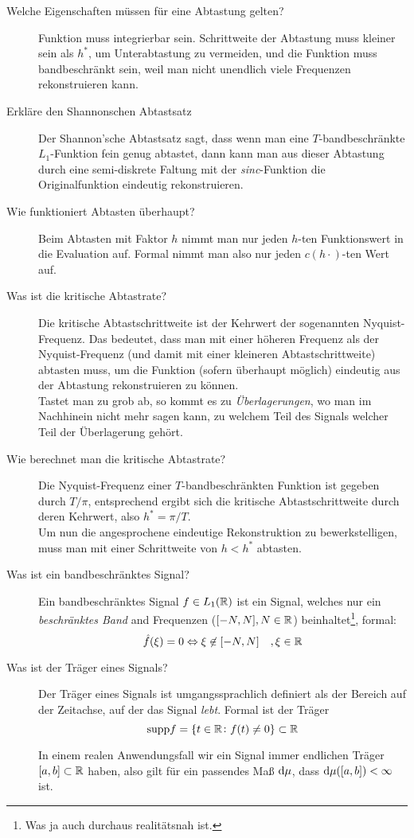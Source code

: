 \begin{description}
	\item[Welche Eigenschaften müssen für eine Abtastung gelten?]
  	Funktion muss integrierbar sein. Schrittweite der Abtastung muss kleiner sein als $ h^{*} $, um 
  	Unterabtastung zu vermeiden, und die Funktion muss bandbeschränkt sein, weil man nicht 
  	unendlich viele Frequenzen rekonstruieren kann.
	\item[Erkläre den Shannonschen Abtastsatz]
      Der Shannon'sche Abtastsatz sagt, dass wenn man eine $T$-bandbeschränkte $L_1$-Funktion fein genug
      abtastet, dann kann man aus dieser Abtastung durch eine semi-diskrete Faltung mit der \emph{sinc}-Funktion
      die Originalfunktion eindeutig rekonstruieren.
	\item[Wie funktioniert Abtasten überhaupt?]
      Beim Abtasten mit Faktor $h$ nimmt man nur jeden $h$-ten Funktionswert in die Evaluation auf.
      Formal nimmt man also nur jeden $c(h\cdot)$-ten Wert auf.
	\item[Was ist die kritische Abtastrate?]
      Die kritische Abtastschrittweite ist der Kehrwert der sogenannten Nyquist-Frequenz. Das bedeutet, dass
      man mit einer höheren Frequenz als der Nyquist-Frequenz (und damit mit einer kleineren Abtastschrittweite) 
      abtasten muss, um die Funktion (sofern überhaupt möglich) eindeutig aus der Abtastung rekonstruieren zu können.\\
      Tastet man zu grob ab, so kommt es zu \emph{Überlagerungen}, wo man im Nachhinein nicht mehr sagen kann, zu welchem
      Teil des Signals welcher Teil der Überlagerung gehört.
	\item[Wie berechnet man die kritische Abtastrate?]
      Die Nyquist-Frequenz einer $T$-bandbeschränkten Funktion ist gegeben durch $T/\pi$, entsprechend ergibt sich
      die kritische Abtastschrittweite durch deren Kehrwert, also $h^* = \pi/T$.\\
      Um nun die angesprochene eindeutige Rekonstruktion zu bewerkstelligen, muss man mit einer Schrittweite von
      $h < h^*$ abtasten.
	\item[Was ist ein bandbeschränktes Signal?]
      Ein bandbeschränktes Signal $f\in L_1(\mathbb{R})$ ist ein Signal, welches nur ein \emph{beschränktes Band} and Frequenzen
      ($[-N,N], N\in\mathbb{R}$) beinhaltet\footnote{Was ja auch durchaus realitätsnah ist.}, formal:
      $$ \hat f(\xi) = 0 \Leftrightarrow \xi \not\in [-N,N]\quad,\xi\in\mathbb{R} $$
	\item[Was ist der Träger eines Signals?]
      Der Träger eines Signals ist umgangssprachlich definiert als der Bereich auf der Zeitachse, auf der
      das Signal \emph{lebt}. Formal ist der Träger
      $$ \text{supp} f = \{t \in \mathbb{R} \colon f(t) \neq 0 \} \subset \mathbb{R} $$

      In einem realen Anwendungsfall wir ein Signal immer endlichen Träger $[a,b]\subset\mathbb{R}$ haben, 
      also gilt für ein passendes Maß $\text{d} \mu$, dass $\text{d} \mu([a,b]) < \infty$ ist.
\end{description}
